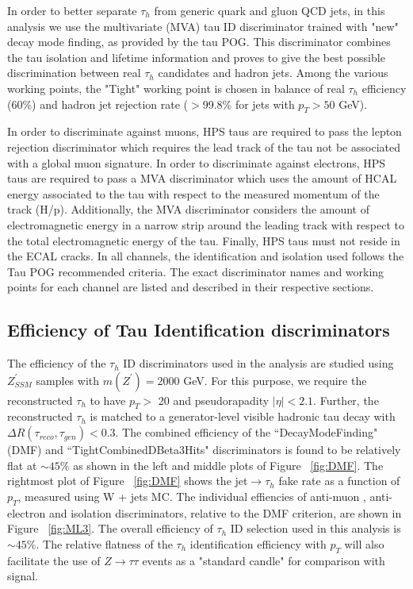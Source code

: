 In order to better separate $\tau_{h}$ from generic quark and gluon QCD jets, in this analysis we use the multivariate 
(MVA) tau ID discriminator trained with "new" decay mode finding, as provided by the tau POG. This discriminator 
combines the tau isolation and lifetime information and proves to give the best possible discrimination between 
real $\tau_{h}$ candidates and hadron jets. Among the various working points, the "Tight" working point is chosen in 
balance of real $\tau_{h}$ efficiency (60\%) and hadron jet rejection rate ($>$99.8\% for jets with $p_{T} > 50$ GeV). 

In order to discriminate against muons, HPS taus are required to pass the lepton rejection 
discriminator which requires the lead track of the tau not be associated with a global muon signature. In order to 
discriminate against electrons, HPS taus are required to pass a MVA discriminator which uses the amount of HCAL energy 
associated to the tau with respect to the measured momentum of the track (H/p). Additionally, the MVA discriminator 
considers the amount of electromagnetic energy in a narrow strip around the leading track with respect to the total 
electromagnetic energy of the tau. Finally, HPS taus must not reside in the ECAL cracks. 
In all channels, the identification and isolation used follows the Tau POG recommended criteria.
The exact discriminator names and working points for each channel are listed and described in their respective sections.


\iffalse

\subsection{Efficiency of Tau Identification discriminators} \label{sec:tauIDeff}
The efficiency of the $\tau_{h}$ ID discriminators used in the analysis are studied using $Z^{\prime}_{SSM}$ samples with $m(Z^{\prime}) = 2000$ GeV. For this 
purpose, we require the reconstructed $\tau_{h}$ to have $p_{T} >$ 20 \gev and pseudorapadity $|\eta| < 2.1$. Further, the reconstructed $\tau_{h}$ is matched to 
a generator-level visible hadronic tau decay with $\Delta R(\tau_{reco},\tau_{gen}) < 0.3$. The combined efficiency of the ``DecayModeFinding" (DMF) and 
``TightCombinedDBeta3Hits" discriminators is found to be relatively flat at $\sim 45$\% as shown in the left and middle plots of Figure ~\ref{fig:DMF}. The 
rightmost plot of Figure ~\ref{fig:DMF} shows the jet$\to\tau_{h}$ fake rate as a function of $p_{T}$, measured using W + jets MC. The individual effiencies of 
anti-muon , anti-electron and isolation discriminators, relative to the DMF criterion, are shown in Figure ~\ref{fig:ML3}. 
The overall efficiency of $\tau_{h}$ ID selection used in this analysis is $\sim 45$\%. 
The relative flatness of the $\tau_{h}$ identification efficiency with $p_{T}$ will also facilitate the use of 
$Z\rightarrow\tau\tau$ events as a "standard candle" for comparison with signal. 

